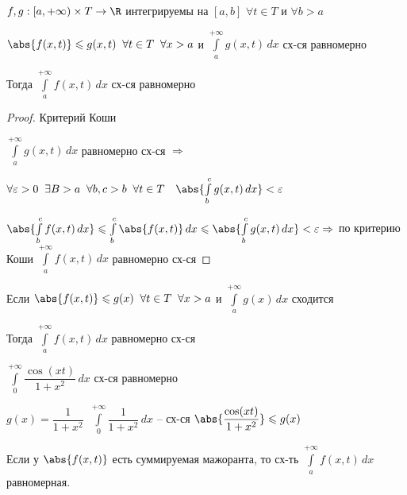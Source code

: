 
\begin{theorem}[Вейерштрасса]\thmslashn
	
	$f, g: [a, +\infty)\times T \to \R$ интегрируемы на $[a, b]$ $\forall t \in T$ и $\forall b > a$
	
	$\abs{f(x, t)} \leqslant g(x, t) \;\; \forall t \in T \;\; \forall x > a$ и $\int\limits_{a}^{+\infty} g(x, t)\,dx$ сх-ся равномерно
	
	Тогда $\int\limits_{a}^{+\infty} f(x, t)\,dx$ сх-ся равномерно
	
\end{theorem}

\begin{proof}\thmslashn
	
	Критерий Коши 
	
	$\int\limits_{a}^{+\infty} g(x, t)\,dx$ равномерно сх-ся $\Rightarrow$ 
	
	$\forall \varepsilon > 0\;\; \exists B > a\;\; \forall b, c > b\;\; \forall t \in T \quad \abs{\int\limits_{b}^{c}g(x, t)\,dx} < \varepsilon$
	
	$\abs{\int\limits_{b}^{c}f(x, t)\,dx} \leqslant \int\limits_{b}^{c}\abs{f(x, t)}\,dx \leqslant \abs{\int\limits_{b}^{c}g(x, t)\,dx} < \varepsilon \Rightarrow$ по критерию Коши $\int\limits_{a}^{+\infty}f(x, t)\,dx$ равномерно сх-ся
	
\end{proof}

\begin{consequence}\thmslashn
	
	Если $\abs{f(x, t)}\leqslant g(x) \;\; \forall t \in T \;\; \forall x > a$ и $\int\limits_{a}^{+\infty} g(x)\,dx$ сходится
	
	Тогда $\int\limits_{a}^{+\infty}f(x, t)\,dx$ равномерно сх-ся
	
\end{consequence}

\begin{example}\thmslashn
	
	$\int\limits_{0}^{+\infty} \dfrac{\cos(xt)}{1 + x^2}\,dx$ сх-ся равномерно
	
	$g(x) = \dfrac{1}{1 + x^2} \;\; \int\limits_{0}^{+\infty} \dfrac{1}{1 + x^2}\,dx$ -- сх-ся $\abs{\dfrac{\cos(xt)}{1 + x^2}} \leqslant g(x)$
	
\end{example}

\begin{remark}\thmslashn
	
	Если у $\abs{f(x, t)}$ есть суммируемая мажоранта, то сх-ть $\int\limits_{a}^{+\infty}f(x, t)\,dx$ равномерная.
	
\end{remark}
